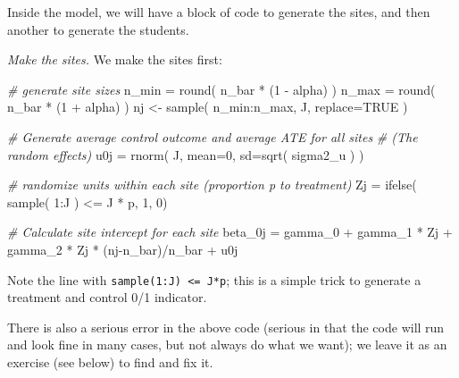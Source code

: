 \documentclass[
]{book}
\newenvironment{Shaded}{\begin{snugshade}}{\end{snugshade}}
\newcommand{\AttributeTok}[1]{\textcolor[rgb]{0.77,0.63,0.00}{#1}}
\newcommand{\CommentTok}[1]{\textcolor[rgb]{0.56,0.35,0.01}{\textit{#1}}}
\newcommand{\ConstantTok}[1]{\textcolor[rgb]{0.00,0.00,0.00}{#1}}
\newcommand{\DecValTok}[1]{\textcolor[rgb]{0.00,0.00,0.81}{#1}}
\newcommand{\FunctionTok}[1]{\textcolor[rgb]{0.00,0.00,0.00}{#1}}
\newcommand{\NormalTok}[1]{#1}
\newcommand{\OtherTok}[1]{\textcolor[rgb]{0.56,0.35,0.01}{#1}}
\newcommand{\SpecialCharTok}[1]{\textcolor[rgb]{0.00,0.00,0.00}{#1}}
\begin{document}
Inside the model, we will have a block of code to generate the sites, and then another to generate the students.

\emph{Make the sites.}
We make the sites first:

\begin{Shaded}
\begin{Highlighting}[]
  \CommentTok{\# generate site sizes }
\NormalTok{  n\_min }\OtherTok{=} \FunctionTok{round}\NormalTok{( n\_bar }\SpecialCharTok{*}\NormalTok{ (}\DecValTok{1} \SpecialCharTok{{-}}\NormalTok{ alpha) )}
\NormalTok{  n\_max }\OtherTok{=} \FunctionTok{round}\NormalTok{( n\_bar }\SpecialCharTok{*}\NormalTok{ (}\DecValTok{1} \SpecialCharTok{+}\NormalTok{ alpha) )}
\NormalTok{  nj }\OtherTok{\textless{}{-}} \FunctionTok{sample}\NormalTok{( n\_min}\SpecialCharTok{:}\NormalTok{n\_max, J, }\AttributeTok{replace=}\ConstantTok{TRUE}\NormalTok{ )}

  \CommentTok{\# Generate average control outcome and average ATE for all sites}
  \CommentTok{\# (The random effects)}
\NormalTok{  u0j }\OtherTok{=} \FunctionTok{rnorm}\NormalTok{( J, }\AttributeTok{mean=}\DecValTok{0}\NormalTok{, }\AttributeTok{sd=}\FunctionTok{sqrt}\NormalTok{( sigma2\_u ) )}
  
  \CommentTok{\# randomize units within each site (proportion p to treatment)}
\NormalTok{  Zj }\OtherTok{=} \FunctionTok{ifelse}\NormalTok{( }\FunctionTok{sample}\NormalTok{( }\DecValTok{1}\SpecialCharTok{:}\NormalTok{J ) }\SpecialCharTok{\textless{}=}\NormalTok{ J }\SpecialCharTok{*}\NormalTok{ p, }\DecValTok{1}\NormalTok{, }\DecValTok{0}\NormalTok{)}
  
  \CommentTok{\# Calculate site intercept for each site}
\NormalTok{  beta\_0j }\OtherTok{=}\NormalTok{ gamma\_0 }\SpecialCharTok{+}\NormalTok{ gamma\_1 }\SpecialCharTok{*}\NormalTok{ Zj }\SpecialCharTok{+}\NormalTok{ gamma\_2 }\SpecialCharTok{*}\NormalTok{ Zj }\SpecialCharTok{*}\NormalTok{ (nj}\SpecialCharTok{{-}}\NormalTok{n\_bar)}\SpecialCharTok{/}\NormalTok{n\_bar }\SpecialCharTok{+}\NormalTok{ u0j}
\end{Highlighting}
\end{Shaded}

Note the line with \texttt{sample(1:J)\ \textless{}=\ J*p}; this is a simple trick to generate a treatment and control 0/1 indicator.

There is also a serious error in the above code (serious in that the code will run and look fine in many cases, but not always do what we want); we leave it as an exercise (see below) to find and fix it.
\end{document}
